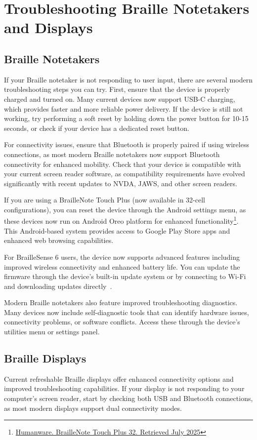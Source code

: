 \chapter{Troubleshooting Braille Notetakers and Displays}\label{trouble2}

\section{Braille Notetakers}\label{notebook}
If your Braille notetaker is not responding to user input, there are several modern troubleshooting steps you can try. First, ensure that the device is properly charged and turned on. Many current devices now support USB-C charging, which provides faster and more reliable power delivery. If the device is still not working, try performing a soft reset by holding down the power button for 10-15 seconds, or check if your device has a dedicated reset button.

For connectivity issues, ensure that Bluetooth is properly paired if using wireless connections, as most modern Braille notetakers now support Bluetooth connectivity for enhanced mobility. Check that your device is compatible with your current screen reader software, as compatibility requirements have evolved significantly with recent updates to NVDA, JAWS, and other screen readers.

If you are using a BrailleNote Touch Plus (now available in 32-cell configurations), you can reset the device through the Android settings menu, as these devices now run on Android Oreo platform for enhanced functionality\footnote{\raggedright \href{https://store.humanware.com/hus/blindness-braillenote-touch-plus-32.html}{Humanware. BrailleNote Touch Plus 32. Retrieved July 2025}}. This Android-based system provides access to Google Play Store apps and enhanced web browsing capabilities.

For BrailleSense 6 users, the device now supports advanced features including improved wireless connectivity and enhanced battery life. You can update the firmware through the device's built-in update system or by connecting to Wi-Fi and downloading updates directly~\cite{BrailleSense6}.

Modern Braille notetakers also feature improved troubleshooting diagnostics. Many devices now include self-diagnostic tools that can identify hardware issues, connectivity problems, or software conflicts. Access these through the device's utilities menu or settings panel.

\section{Braille Displays}\label{display2}
Current refreshable Braille displays offer enhanced connectivity options and improved troubleshooting capabilities. If your display is not responding to your computer's screen reader, start by checking both USB and Bluetooth connections, as most modern displays support dual connectivity modes.

